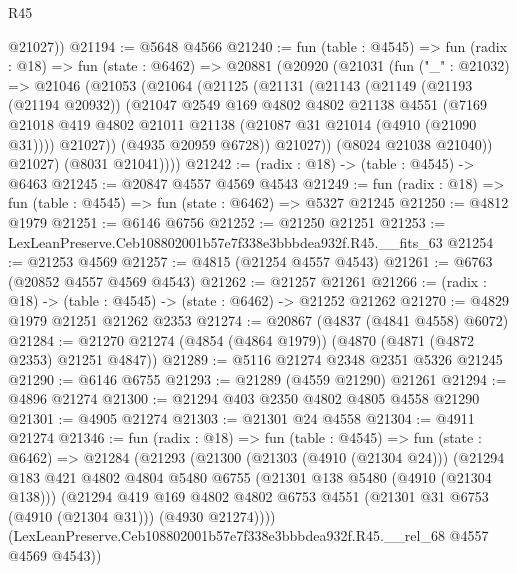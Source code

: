 \begin{lexlean}{R45}
\begin{coremodule}
        @21027))
@21194 := @5648 @4566
@21240 := fun (table : @4545) =>
  fun (radix : @18) =>
  fun (state : @6462) =>
  @20881
    (@20920
      (@21031
        (fun ("_" : @21032) =>
        @21046
          (@21053
            (@21064
              (@21125
                (@21131
                  (@21143
                    (@21149
                      (@21193 (@21194 @20932))
                      (@21047
                        @2549
                        @169
                        @4802
                        @4802
                        @21138
                        @4551
                        (@7169
                          @21018
                          @419
                          @4802
                          @21011
                          @21138
                          (@21087 @31 @21014 (@4910 (@21090 @31))))
                        @21027))
                    (@4935 @20959 @6728))
                  @21027))
              (@8024 @21038 @21040))
            @21027)
          (@8031 @21041))))
@21242 := (radix : @18) -> (table : @4545) -> @6463
@21245 := @20847 @4557 @4569 @4543
@21249 := fun (radix : @18) => fun (table : @4545) => fun (state : @6462) => @5327 @21245
@21250 := @4812 @1979
@21251 := @6146 @6756
@21252 := @21250 @21251
@21253 := LexLeanPreserve.Ceb108802001b57e7f338e3bbbdea932f.R45.__fits_63
@21254 := @21253 @4569
@21257 := @4815 (@21254 @4557 @4543)
@21261 := @6763 (@20852 @4557 @4569 @4543)
@21262 := @21257 @21261
@21266 := (radix : @18) -> (table : @4545) -> (state : @6462) -> @21252 @21262
@21270 := @4829 @1979 @21251 @21262 @2353
@21274 := @20867 (@4837 (@4841 @4558) @6072)
@21284 := @21270 @21274 (@4854 (@4864 @1979)) (@4870 (@4871 (@4872 @2353) @21251 @4847))
@21289 := @5116 @21274 @2348 @2351 @5326 @21245
@21290 := @6146 @6755
@21293 := @21289 (@4559 @21290) @21261
@21294 := @4896 @21274
@21300 := @21294 @403 @2350 @4802 @4805 @4558 @21290
@21301 := @4905 @21274
@21303 := @21301 @24 @4558
@21304 := @4911 @21274
@21346 := fun (radix : @18) =>
  fun (table : @4545) =>
  fun (state : @6462) =>
  @21284
    (@21293
      (@21300
        (@21303 (@4910 (@21304 @24)))
        (@21294
          @183
          @421
          @4802
          @4804
          @5480
          @6755
          (@21301 @138 @5480 (@4910 (@21304 @138)))
          (@21294
            @419
            @169
            @4802
            @4802
            @6753
            @4551
            (@21301 @31 @6753 (@4910 (@21304 @31)))
            (@4930 @21274))))
      (LexLeanPreserve.Ceb108802001b57e7f338e3bbbdea932f.R45.__rel_68 @4557 @4569 @4543))

\end{coremodule}
\end{lexlean}
